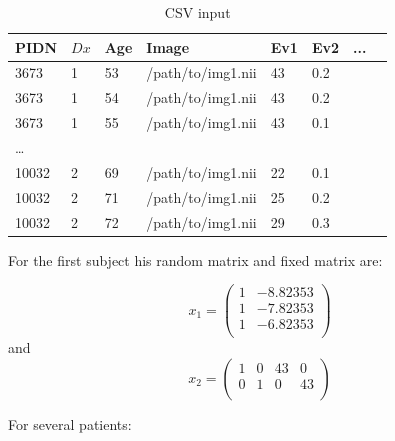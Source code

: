 \documentclass[final, paper=letter,5p,times,twocolumn]{elsarticle}
\theoremstyle{definition}
\begin{document}
\begin{table}[]
\centering
\caption{CSV input}
\label{CSVinput}
\begin{tabular}{|l|l|l|l|l|l|l|l|}
\hline
 PIDN &  $Dx$ &  Age &  Image & Ev1 & Ev2 & ... \\ \hline \hline
3673  & 1 &  53 & /path/to/img1.nii &  43 & 0.2 &  \\ \hline
3673  & 1 &  54 & /path/to/img1.nii &  43 & 0.2 &  \\ \hline
3673  & 1 &  55 & /path/to/img1.nii &  43 & 0.1 &  \\ \hline
\dots &   &     &                   &     &     &  \\ \hline
10032 & 2 &  69 & /path/to/img1.nii &  22 & 0.1 &  \\ \hline
10032 & 2 &  71 & /path/to/img1.nii &  25 & 0.2 &  \\ \hline
10032 & 2 &  72 & /path/to/img1.nii &  29 & 0.3 &  \\ \hline
\end{tabular}
\end{table}

For the first subject his random matrix and fixed matrix are:

$$
x_{1} = \left(
\begin{array}{cc}
1 & -8.82353 \\
1 & -7.82353 \\
1 & -6.82353 \\
\end{array}
\right)
$$
and
$$
x_{2} = \left(
\begin{array}{cccc}
1 & 0 & 43 &  0 \\
0 & 1 &  0 & 43 \\
\end{array}
\right)
$$

For several patients:
\end{document}

